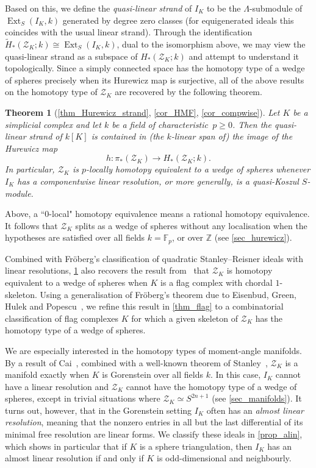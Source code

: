 \documentclass[a4paper,10pt]{amsart}
\newtheorem{theorema}{Theorem}
\theoremstyle{definition}
\theoremstyle{remark}
\DeclareMathOperator{\Ext}{Ext}
\begin{document}
Based on this, we define the \emph{quasi-linear strand} of $I_K$ to be the $\Lambda$-submodule of $\Ext_S(I_K,k)$ generated by degree zero classes (for equigenerated ideals this coincides with the usual linear strand). Through the identification  $\widetilde{H}_*(\mathcal{Z}_K;k) \cong \Ext_S(I_K,k)$, dual to the isomorphism above, we may view the quasi-linear strand as a subspace of $H_*(\mathcal{Z}_K;k)$ and attempt to understand it topologically. Since a simply connected space has the homotopy type of a wedge of spheres precisely when its Hurewicz map is surjective, all of the above results on the homotopy type of $\mathcal{Z}_K$ are recovered by the following theorem.

\begin{theorema}[\cref{thm_Hurewicz_strand}, \cref{cor_HMF}, \cref{cor_compwise}] \label{thm_introA}
Let $K$ be a simplicial complex and let $k$ be a field of characteristic~$p\geqslant 0$. Then the quasi-linear strand of $k[K]$ is contained in (the $k$-linear span of) the image of the Hurewicz map 
\[ 
h\colon \pi_*(\mathcal{Z}_K)\longrightarrow {H}_*(\mathcal{Z}_K;k).
\]
In particular, $\mathcal{Z}_K$ is $p$-locally homotopy equivalent to a wedge of spheres whenever $I_K$ has a componentwise linear resolution, or more generally, is a quasi-Koszul $S$-module.
\end{theorema}

Above, a ``$0$-local" homotopy equivalence means a rational homotopy equivalence. It follows that $\mathcal{Z}_K$ splits as a wedge of spheres without any localisation when the hypotheses are satisfied over all fields $k=\mathbb{F}_p$, or over $\mathbb{Z}$ (see \cref{sec_hurewicz}).

Combined with Fr\"oberg's classification of quadratic Stanley--Reisner ideals with linear resolutions, \cref{thm_introA} also recovers the result from~\cite{GPTW} that $\mathcal{Z}_K$ is homotopy equivalent to a wedge of spheres when $K$ is a flag complex with chordal $1$-skeleton. Using a generalisation of Fr\"oberg's theorem due to Eisenbud, Green, Hulek and Popescu~\cite{EGHP}, we refine this result in \cref{thm_flag} to a combinatorial classification of flag complexes $K$ for which a given skeleton of $\mathcal{Z}_K$ has the homotopy type of a wedge of spheres.

We are especially interested in the homotopy types of moment-angle manifolds. By a result of Cai~\cite[Corollary~2.10]{C}, combined with a well-known theorem of Stanley~\cite[Theorem~II.5.1]{Stan}, $\mathcal{Z}_K$ is a manifold exactly when $K$ is Gorenstein over all fields $k$. In this case, $I_K$ cannot have a linear resolution and $\mathcal{Z}_K$ cannot have the homotopy type of a wedge of spheres, except in trivial situations where $\mathcal{Z}_K\simeq S^{2n+1}$ (see \cref{sec_manifolds}). It turns out, however, that in the Gorenstein setting $I_K$ often has an \emph{almost linear resolution}, meaning that the nonzero entries in all but the last differential of its minimal free resolution are linear forms. We classify these ideals in \cref{prop_alin}, which shows in particular that if $K$ is a sphere triangulation, then $I_K$ has an almost linear resolution if and only if $K$ is odd-dimensional and neighbourly. 
\end{document}
